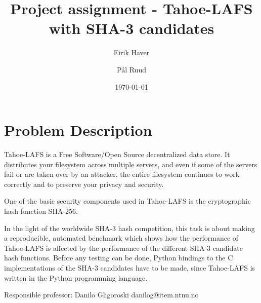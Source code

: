 \documentclass[english,12pt,a4paper]{report}
\author{Eirik Haver \and Pål Ruud}
\title{Project assignment - Tahoe-LAFS with SHA-3 candidates}
\date{\today}
\begin{document}
\chapter*{Problem Description}

Tahoe-LAFS is a Free Software/Open Source decentralized data store. It
distributes your filesystem across multiple servers, and even if some of the
servers fail or are taken over by an attacker, the entire filesystem continues
to work correctly and to preserve your privacy and security.

One of the basic security components used in Tahoe-LAFS is the cryptographic
hash function SHA-256.

In the light of the worldwide SHA-3 hash competition, this task is about
making a reproducible, automated benchmark which shows how the performance of
Tahoe-LAFS is affected by the performance of the different SHA-3 candidate hash
functions. Before any testing can be done, Python bindings to the C
implementations of the SHA-3 candidates have to be made, since Tahoe-LAFS is
written in the Python programming language.

\vspace{10mm}
Responsible professor: Danilo Gligoroski danilog@item.ntnu.no
\end{document}
